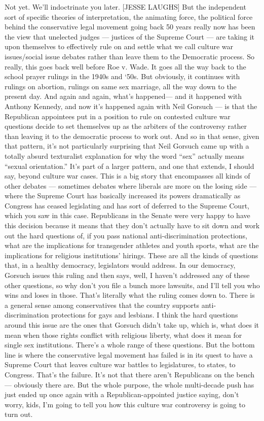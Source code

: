 Not yet. We'll indoctrinate you later. {[}JESSE LAUGHS{]} But the
independent sort of specific theories of interpretation, the animating
force, the political force behind the conservative legal movement going
back 50 years really now has been the view that unelected judges ---
justices of the Supreme Court --- are taking it upon themselves to
effectively rule on and settle what we call culture war issues/social
issue debates rather than leave them to the Democratic process. So
really, this goes back well before Roe v. Wade. It goes all the way back
to the school prayer rulings in the 1940s and `50s. But obviously, it
continues with rulings on abortion, rulings on same sex marriage, all
the way down to the present day. And again and again, what's happened---
and it happened with Anthony Kennedy, and now it's happened again with
Neil Gorsuch --- is that the Republican appointees put in a position to
rule on contested culture war questions decide to set themselves up as
the arbiters of the controversy rather than leaving it to the democratic
process to work out. And so in that sense, given that pattern, it's not
particularly surprising that Neil Gorsuch came up with a totally absurd
texturalist explanation for why the word ``sex'' actually means ``sexual
orientation.'' It's part of a larger pattern, and one that extends, I
should say, beyond culture war cases. This is a big story that
encompasses all kinds of other debates --- sometimes debates where
liberals are more on the losing side --- where the Supreme Court has
basically increased its powers dramatically as Congress has ceased
legislating and has sort of deferred to the Supreme Court, which you saw
in this case. Republicans in the Senate were very happy to have this
decision because it means that they don't actually have to sit down and
work out the hard questions of, if you pass national anti-discrimination
protections, what are the implications for transgender athletes and
youth sports, what are the implications for religious institutions'
hirings. These are all the kinds of questions that, in a healthy
democracy, legislators would address. In our democracy, Gorsuch issues
this ruling and then says, well, I haven't addressed any of these other
questions, so why don't you file a bunch more lawsuits, and I'll tell
you who wins and loses in those. That's literally what the ruling comes
down to. There is a general sense among conservatives that the country
supports anti-discrimination protections for gays and lesbians. I think
the hard questions around this issue are the ones that Gorsuch didn't
take up, which is, what does it mean when those rights conflict with
religious liberty, what does it mean for single sex institutions.
There's a whole range of these questions. But the bottom line is where
the conservative legal movement has failed is in its quest to have a
Supreme Court that leaves culture war battles to legislatures, to
states, to Congress. That's the failure. It's not that there aren't
Republicans on the bench--- obviously there are. But the whole purpose,
the whole multi-decade push has just ended up once again with a
Republican-appointed justice saying, don't worry, kids, I'm going to
tell you how this culture war controversy is going to turn out.

